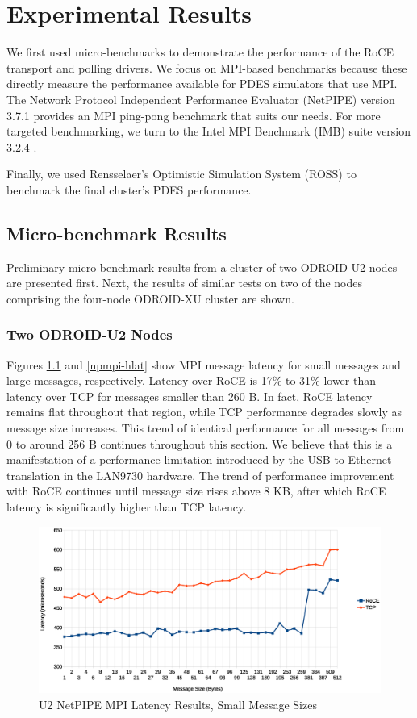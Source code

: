 \documentclass[11pt]{book}
\begin{document}
\chapter{Experimental Results}\label{results}

We first used micro-benchmarks to demonstrate the performance of the RoCE transport and
polling drivers.  We focus on MPI-based benchmarks because these directly measure the
performance available for PDES simulators that use MPI.  The Network Protocol Independent
Performance Evaluator (NetPIPE) \cite{NetPIPE} version 3.7.1 provides an MPI ping-pong
benchmark that suits our needs.  For more targeted benchmarking, we turn to the Intel MPI
Benchmark (IMB) suite version 3.2.4 \cite{intel-mpi}.

Finally, we used Rensselaer's Optimistic Simulation System (ROSS) to benchmark
the final cluster's PDES performance.

\section{Micro-benchmark Results}

Preliminary micro-benchmark results from a cluster of two ODROID-U2 nodes are presented
first.  Next, the results of similar tests on two of the nodes comprising the four-node
ODROID-XU cluster are shown.

\subsection{Two ODROID-U2 Nodes}

Figures \ref{npmpi-llat} and \ref{npmpi-hlat} show MPI message latency for small messages
and large messages, respectively.  Latency over RoCE is 17\% to 31\% lower than latency
over TCP for messages smaller than 260 B.  In fact, RoCE latency remains flat throughout
that region, while TCP performance degrades slowly as message size increases.  This trend
of identical performance for all messages from 0 to around 256 B continues throughout this
section.  We believe that this is a manifestation of a performance limitation introduced
by the USB-to-Ethernet translation in the LAN9730 hardware.  The trend of performance
improvement with RoCE continues until message size rises above 8 KB, after which RoCE
latency is significantly higher than TCP latency.

\begin{figure}
\includegraphics[width=\textwidth]{netpipe_lat_small}
\caption{U2 NetPIPE MPI Latency Results, Small Message Sizes}\label{npmpi-llat}
\end{figure}
\end{document}
